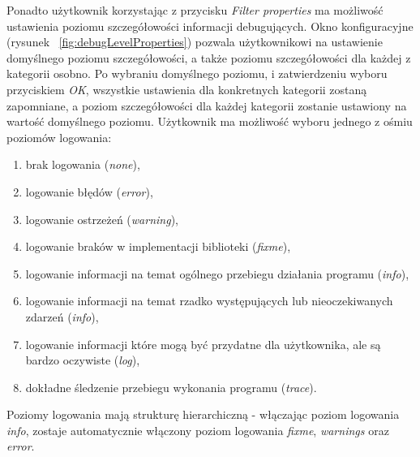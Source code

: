 \documentclass[12pt]{article}
\begin{document}
Ponadto użytkownik korzystając z przycisku \textit{Filter properties} ma możliwość ustawienia poziomu szczegółowości informacji debugujących. Okno konfiguracyjne (rysunek ~\ref{fig:debugLevelProperties}) pozwala użytkownikowi na ustawienie domyślnego poziomu szczegółowości, a także poziomu szczegółowości dla każdej z kategorii osobno. Po wybraniu domyślnego poziomu, i zatwierdzeniu wyboru przyciskiem \textit{OK}, wszystkie ustawienia dla konkretnych kategorii zostaną zapomniane, a poziom szczegółowości dla każdej kategorii zostanie ustawiony na wartość domyślnego poziomu.
Użytkownik ma możliwość wyboru jednego z ośmiu poziomów logowania:
\begin{enumerate}
 \setlength{\itemsep}{0em}
\item brak logowania (\textit{none}),
\item logowanie błędów (\textit{error}),
\item logowanie ostrzeżeń (\textit{warning}),
\item logowanie braków w implementacji biblioteki (\textit{fixme}),
\item logowanie informacji na temat ogólnego przebiegu działania programu (\textit{info}),
\item logowanie informacji na temat rzadko występujących lub nieoczekiwanych zdarzeń (\textit{info}),
\item logowanie informacji które mogą być przydatne dla użytkownika, ale są bardzo oczywiste (\textit{log}),
\item dokładne śledzenie przebiegu wykonania programu (\textit{trace}).
\end{enumerate}
Poziomy logowania mają strukturę hierarchiczną - włączając poziom logowania \textit{info}, zostaje automatycznie włączony poziom logowania \textit{fixme}, \textit{warnings} oraz \textit{error}.
\end{document}
